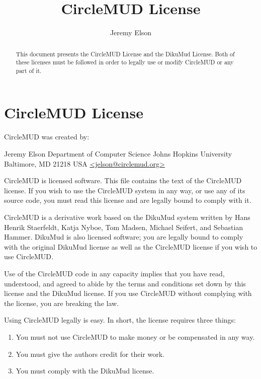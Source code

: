 \documentclass[11pt]{article}
\title{CircleMUD License}
\author{Jeremy Elson}
\begin{document}
\maketitle

\begin{abstract}
This document presents the CircleMUD License and the DikuMud License.  Both of these licenses must be followed in order to legally use or modify CircleMUD or any part of it.
\end{abstract}

\section{CircleMUD License}
CircleMUD was created by:
\par
Jeremy Elson\newline
Department of Computer Science\newline
Johns Hopkins University\newline
Baltimore, MD  21218  USA\newline
\url{<jelson@circlemud.org>}
\par
CircleMUD is licensed software.  This file contains the text of the CircleMUD license.  If you wish to use the CircleMUD system in any way, or use any of its source code, you must read this license and are legally bound to comply with it.
\par
CircleMUD is a derivative work based on the DikuMud system written by Hans Henrik Staerfeldt, Katja Nyboe, Tom Madsen, Michael Seifert, and Sebastian Hammer.  DikuMud is also licensed software; you are legally bound to comply with the original DikuMud license as well as the CircleMUD license if you wish to use CircleMUD.
\par
Use of the CircleMUD code in any capacity implies that you have read, understood, and agreed to abide by the terms and conditions set down by this license and the DikuMud license.  If you use CircleMUD without complying with the license, you are breaking the law.
\par
Using CircleMUD legally is easy.  In short, the license requires three things:
\begin{enumerate}
\item You must not use CircleMUD to make money or be compensated in any way.
\item You must give the authors credit for their work.
\item You must comply with the DikuMud license.
\end{enumerate}
\end{document}
